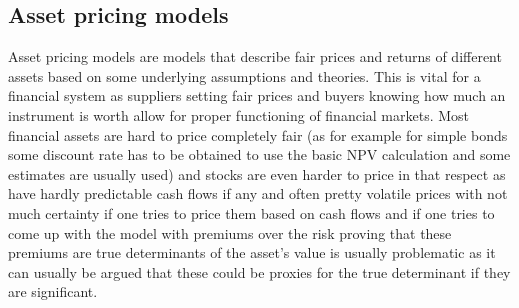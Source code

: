 \documentclass[a4paper,12pt]{article} %
\begin{document}
	\subsection{Asset pricing models}
	Asset pricing models are models that describe fair prices and returns of different assets based on some underlying assumptions and theories. This is vital for a financial system as suppliers setting fair prices and buyers knowing how much an instrument is worth allow for proper functioning of financial markets. Most financial assets are hard to price completely fair (as for example for simple bonds some discount rate has to be obtained to use the basic NPV calculation and some estimates are usually used) and stocks are even harder to price in that respect as have hardly predictable cash flows if any and often pretty volatile prices with not much certainty if one tries to price them based on cash flows and if one tries to come up with the model with premiums over the risk proving that these premiums are true determinants of the asset's value is usually problematic as it can usually be argued that these could be proxies for the true determinant if they are significant.
	
\end{document}

